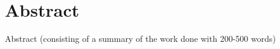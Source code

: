 
\chapter*{Abstract}
\label{ch:abstract}

\relax
{}\relax

Abstract (consisting of a summary of the work done with 200-500 words)

\relax
{}\relax